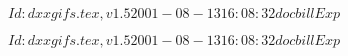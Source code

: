 \documentclass{article}
\begin{document}
$Id: dxxgifs.tex,v 1.5 2001-08-13 16:08:32 docbill Exp $


\pagebreak


$Id: dxxgifs.tex,v 1.5 2001-08-13 16:08:32 docbill Exp $


\pagebreak
\end{document}

